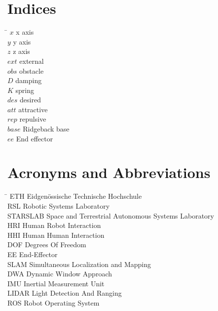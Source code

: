 \section*{Indices}
\begin{tabbing}
 \hspace*{2.2cm}  \= \kill
 $x$ \> x axis \\[0.5ex]
 $y$ \> y axis \\[0.5ex]
 $z$ \> z axis \\[0.5ex]
 $ext$ \> external \\[0.5ex]
 $obs$ \> obstacle \\[0.5ex]
 $D$ \> damping \\[0.5ex]
 $K$ \> spring \\[0.5ex]
 $des$ \> desired \\[0.5ex]
 $att$ \> attractive \\[0.5ex]
 $rep$ \> repulsive \\[0.5ex]
 $base$ \> Ridgeback base\\[0.5ex]
 $ee$ \> End effector \\[0.5ex]
 
 

\end{tabbing}

\section*{Acronyms and Abbreviations}
\begin{tabbing}
 \hspace*{2.2cm}  \= \kill
 ETH \> Eidgenössische Technische Hochschule \\[0.5ex]
 RSL \> Robotic Systems Laboratory \\[0.5ex]
 STARSLAB \> Space and Terrestrial Autonomous Systems Laboratory \\[0.5ex]
 HRI \> Human Robot Interaction \\[0.5ex]
 HHI \> Human Human Interaction \\[0.5ex]
 DOF \> Degrees Of Freedom \\[0.5ex]
 EE \> End-Effector \\[0.5ex]
 SLAM \> Simultaneous Localization and Mapping \\[0.5ex]
 DWA \> Dynamic Window Approach \\[0.5ex]
 IMU \> Inertial Measurement Unit \\[0.5ex]
 LIDAR \> Light Detection And Ranging \\[0.5ex]
 ROS \> Robot Operating System \\[0.5ex]
\end{tabbing}